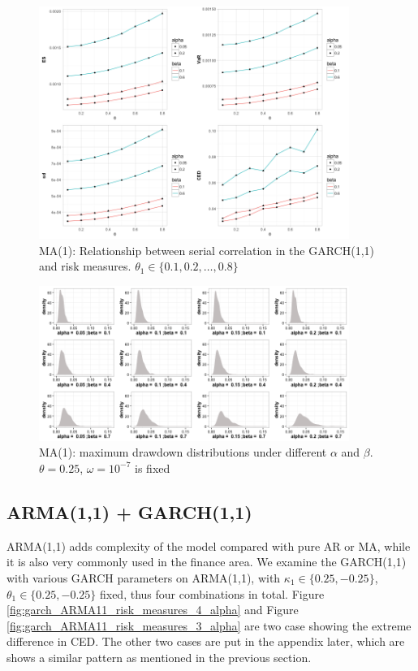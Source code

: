\documentclass[11pt]{article}
\begin{document}
\begin{figure}[H]
\centering
\includegraphics[width = 0.9\textwidth]{../figures/simulation_garch/garch_MA1_risk_measures_ma1}
\caption{MA(1): Relationship between serial correlation in the GARCH(1,1) and risk measures. $\theta_1 \in \{0.1,0.2, \dots, 0.8 \}$}
\label{fig:garch_rm_coef_ma}
\end{figure}

\begin{figure}[H]
\centering
\includegraphics[width = 0.9\textwidth]{../figures/simulation_garch/garch_MA1_alpha_beta}
\caption{MA(1): maximum drawdown distributions under different $\alpha$ and $\beta$. $\theta = 0.25$, $\omega = 10^{-7}$ is fixed }
\label{fig:garch_ma1_ddd}
\end{figure}

\subsection{ARMA(1,1) + GARCH(1,1)}
ARMA(1,1) adds complexity of the model compared with pure AR or MA, while it is also very commonly used in the finance area. We examine the GARCH(1,1) with various GARCH parameters on ARMA(1,1), with $\kappa_1 \in \{0.25, -0.25\}$, $\theta_1 \in \{0.25, -0.25\}$ fixed, thus four combinations in total. Figure \ref{fig:garch_ARMA11_risk_measures_4_alpha} and Figure \ref{fig:garch_ARMA11_risk_measures_3_alpha} are two case showing the extreme difference in CED. The other two cases are put in the appendix later, which are shows a similar pattern as mentioned in the previous section.
\end{document}
